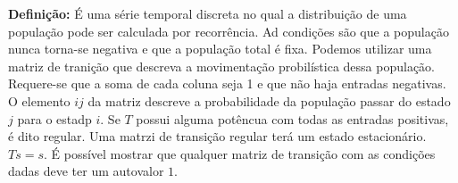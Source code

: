 \documentclass[12pt,letterpaper]{article}
\begin{document}
\textbf{Definição:} É uma série temporal discreta no qual a distribuição de uma população pode ser calculada por recorrência. Ad condições são que a população nunca torna-se negativa e que a população total é fixa. Podemos utilizar uma matriz de tranição que descreva a movimentação probilística dessa população. Requere-se que a soma de cada coluna seja 1 e que não haja entradas negativas. O elemento $ij$ da matriz descreve a probabilidade da população passar do estado $j$ para o estadp $i$. Se $T$ possui alguma potêncua com todas as entradas positivas, é dito regular. Uma matrzi de transição regular terá um estado estacionário. $Ts = s$. É possível mostrar que qualquer matriz de transição com as condições dadas deve ter um autovalor $1$.
\end{document}
